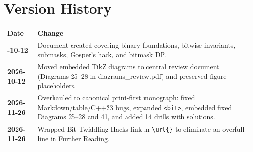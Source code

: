 \documentclass[11pt,a4paper]{article}
\theoremstyle{definition}
\begin{document}
\section*{Version History}

\begin{center}
\begingroup
\small
{}
\begin{tabularx}{\textwidth}{>{\bfseries}l >{\raggedright\arraybackslash}X}
\arrayrulecolor{primaryblue}\toprule[1.2pt]
\rowcolor{primaryblue!10}
\textcolor{primaryblue}{\textbf{Date}} & \textcolor{primaryblue}{\textbf{Change}} \\
\arrayrulecolor{codeframe}\midrule[0.6pt]
2026-10-12 & Document created covering binary foundations, bitwise invariants, submasks, Gosper's hack, and bitmask DP. \\
2026-10-12 & Moved embedded TikZ diagrams to central review document (Diagrams 25--28 in diagrams\_review.pdf) and preserved figure placeholders. \\
2026-11-26 & Overhauled to canonical print-first monograph: fixed Markdown/table/C++23 bugs, expanded \texttt{<bit>}, embedded fixed Diagrams 25--28 and 41, and added 14 drills with solutions. \\
2026-11-26 & Wrapped Bit Twiddling Hacks link in \texttt{\textbackslash url\{\}} to eliminate an overfull line in Further Reading. \\
\arrayrulecolor{primaryblue}\bottomrule[1.2pt]
\end{tabularx}
\endgroup
\end{center}
\end{document}
